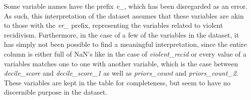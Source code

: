 \documentclass[11pt, fleqn, titlepage]{article}
\begin{document}
	\noindent Some variable names have the prefix \textit{v\_}, which has been disregarded as an error. As such, this interpretation of the dataset assumes that these variables are akin to those with the \textit{vr\_} prefix, representing the variables related to violent recidivism. Furthermore, in the case of a few of the variables in the dataset, it has simply not been possible to find a meaningful interpretation, since the entire column is either full of NaN's like in the case of \textit{violent\_recid} or every value of a variables matches one to one with another variable, which is the case between \textit{decile\_score} and \textit{decile\_score\_1} as well as \textit{priors\_count} and \textit{priors\_count\_2}. These variables are kept in the table for completeness, but seem to have no discernible purpose in the dataset.
	\newpage
	\setlength\LTleft{-9mm}
\end{document}
